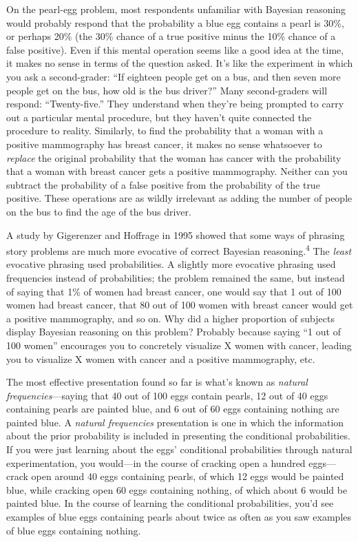 {
 On the pearl-egg problem, most respondents unfamiliar with
Bayesian reasoning would probably respond that the probability a blue
egg contains a pearl is 30\%, or perhaps 20\% (the 30\% chance of a
true positive minus the 10\% chance of a false positive). Even if this
mental operation seems like a good idea at the time, it makes no sense
in terms of the question asked. It's like the
experiment in which you ask a second-grader: ``If
eighteen people get on a bus, and then seven more people get on the
bus, how old is the bus driver?'' Many second-graders
will respond: ``Twenty-five.'' They
understand when they're being prompted to carry out a
particular mental procedure, but they haven't quite
connected the procedure to reality. Similarly, to find the probability
that a woman with a positive mammography has breast cancer, it makes no
sense whatsoever to \textit{replace} the original probability that the
woman has cancer with the probability that a woman with breast cancer
gets a positive mammography. Neither can you subtract the probability
of a false positive from the probability of the true positive. These
operations are as wildly irrelevant as adding the number of people on
the bus to find the age of the bus driver.}

{
 A study by Gigerenzer and Hoffrage in 1995 showed that some ways
of phrasing story problems are much more evocative of correct Bayesian
reasoning.\textsuperscript{4} The \textit{least} evocative phrasing
used probabilities. A slightly more evocative phrasing used frequencies
instead of probabilities; the problem remained the same, but instead of
saying that 1\% of women had breast cancer, one would say that 1 out of
100 women had breast cancer, that 80 out of 100 women with breast
cancer would get a positive mammography, and so on. Why did a higher
proportion of subjects display Bayesian reasoning on this problem?
Probably because saying ``1 out of 100
women'' encourages you to concretely visualize X
women with cancer, leading you to visualize X women with cancer and a
positive mammography, etc.}

{
 The most effective presentation found so far is
what's known as \textit{natural frequencies}{}---saying
that 40 out of 100 eggs contain pearls, 12 out of 40 eggs containing
pearls are painted blue, and 6 out of 60 eggs containing nothing are
painted blue. A \textit{natural frequencies} presentation is one in
which the information about the prior probability is included in
presenting the conditional probabilities. If you were just learning
about the eggs' conditional probabilities through
natural experimentation, you would---in the course of cracking open a
hundred eggs---crack open around 40 eggs containing pearls, of which 12
eggs would be painted blue, while cracking open 60 eggs containing
nothing, of which about 6 would be painted blue. In the course of
learning the conditional probabilities, you'd see
examples of blue eggs containing pearls about twice as often as you saw
examples of blue eggs containing nothing.}

